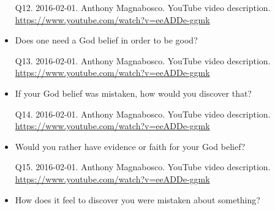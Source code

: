 \documentclass[a4paper]{scrartcl}
\begin{document}
\begin{itemize}
                \begin{tiny}
                    Q12.
                    2016-02-01.
                    Anthony Magnabosco.
                        YouTube video description.
                        \\
                        \url{ https://www.youtube.com/watch?v=eeADDe-ggmk }
                    \par
                \end{tiny}
                    \item Does one need a God belief in order to be good?
                    
                \begin{tiny}
                    Q13.
                    2016-02-01.
                    Anthony Magnabosco.
                        YouTube video description.
                        \\
                        \url{ https://www.youtube.com/watch?v=eeADDe-ggmk }
                    \par
                \end{tiny}
                    \item If your God belief was mistaken, how would you discover that?
                    
                \begin{tiny}
                    Q14.
                    2016-02-01.
                    Anthony Magnabosco.
                        YouTube video description.
                        \\
                        \url{ https://www.youtube.com/watch?v=eeADDe-ggmk }
                    \par
                \end{tiny}
                    \item Would you rather have evidence or faith for your God belief?
                    
                \begin{tiny}
                    Q15.
                    2016-02-01.
                    Anthony Magnabosco.
                        YouTube video description.
                        \\
                        \url{ https://www.youtube.com/watch?v=eeADDe-ggmk }
                    \par
                \end{tiny}
                    \item How does it feel to discover you were mistaken about something?
                    

\end{itemize}
\end{document}
